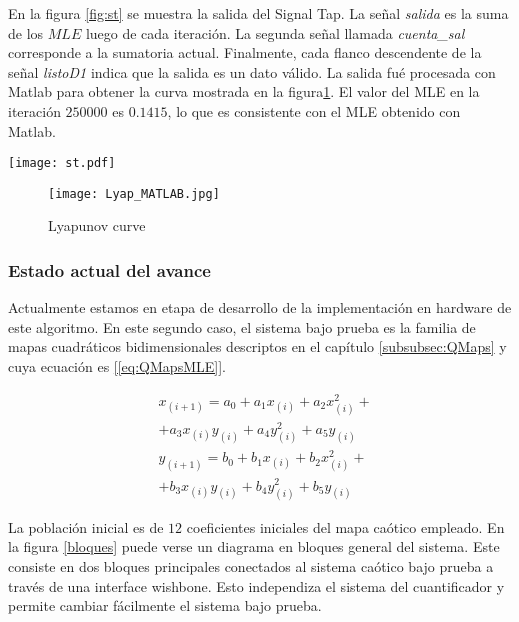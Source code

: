 En la figura \ref{fig:st} se muestra la salida del Signal Tap.
La señal \textit{salida} es la suma de los $MLE$ luego de cada iteración.
La segunda señal llamada \textit{cuenta\_sal} corresponde a la sumatoria actual.
Finalmente, cada flanco descendente de la señal \textit{listoD1} indica que la salida es un dato válido.
La salida fué procesada con Matlab para obtener la curva mostrada en la figura\ref{fig:lyapu}.
El valor del MLE en la iteración $250000$ es $0.1415$, lo que es consistente con el MLE obtenido con Matlab.
%
\begin{figure*}
	\centering
	\texttt{[image: st.pdf]}\\
	\caption{Signal Tap output.}\label{fig:st}
\end{figure*}
%
\begin{figure}
	\centering
	\texttt{[image: Lyap\_MATLAB.jpg]}\\
	\caption{Lyapunov curve}\label{fig:lyapu}
\end{figure}


\subsubsection{Estado actual del avance}

Actualmente estamos en etapa de desarrollo de la implementación en hardware de este algoritmo.
En este segundo caso, el sistema bajo prueba es la familia de mapas cuadráticos bidimensionales descriptos en el capítulo \ref{subsubsec:QMaps} y cuya ecuación es \ref{[eq:QMapsMLE]}.

\begin{eqnarray}\label{eq:QMapsMLE}
&x_{(i+1)}=a_0 + a_1 x_{(i)} + a_2 x_{(i)}^2 +\\ \nonumber
&+ a_3 x_{(i)} y_{(i)} + a_4 y_{(i)}^2 + a_5 y_{(i)}\\ \nonumber
&y_{(i+1)}=b_0 + b_1 x_{(i)} + b_2 x_{(i)}^2 +\\ \nonumber
&+ b_3 x_{(i)} y_{(i)} + b_4 y_{(i)}^2 + b_5 y_{(i)}\nonumber
\end{eqnarray}

La población inicial es de $12$ coeficientes iniciales del mapa caótico empleado.
En la figura \ref{bloques} puede verse un diagrama en bloques general del sistema.
Este consiste en dos bloques principales conectados al sistema caótico bajo prueba a través de una interface wishbone.
Esto independiza el sistema del cuantificador y permite cambiar fácilmente el sistema bajo prueba.


